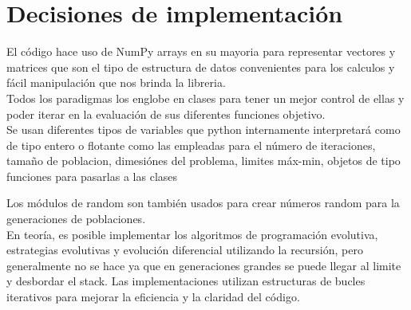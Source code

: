 \documentclass{article}
\begin{document}
\section{Decisiones de implementación}

El código hace uso de NumPy arrays en su mayoria para representar vectores y matrices que son el tipo de estructura de datos convenientes para los calculos y fácil manipulación que nos brinda la libreria.\\

Todos los paradigmas los englobe en clases para tener un mejor control de ellas y poder iterar en la evaluación de sus diferentes funciones objetivo.\\

Se usan diferentes tipos de variables que python internamente interpretará como de tipo entero o flotante como las empleadas para el número de iteraciones, tamaño de poblacion, dimesiónes del problema, limites máx-min, objetos de tipo funciones para pasarlas a las clases

Los módulos de random son también usados para crear números random para la generaciones de poblaciones.\\

En teoría, es posible implementar los algoritmos de programación evolutiva, estrategias evolutivas y evolución diferencial utilizando la recursión, pero generalmente no se hace ya que en generaciones grandes se puede llegar al limite y desbordar el stack. Las implementaciones utilizan estructuras de bucles iterativos para mejorar la eficiencia y la claridad del código. 
\newpage
\end{document}
